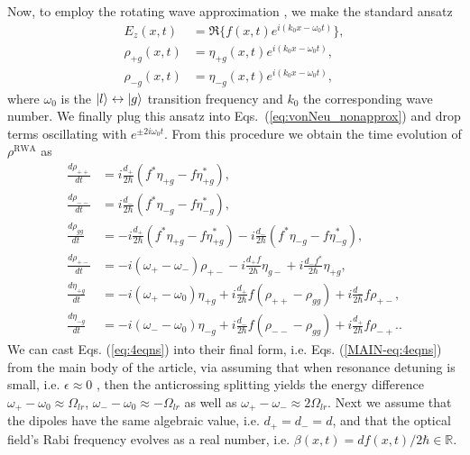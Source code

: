 \documentclass[preprint,secnumarabic,amssymb, nobibnotes, aip, prd]{revtex4-1}
\begin{document}
Now, to employ the rotating wave approximation \cite{weiner2011ultrafast}, we make the standard ansatz 
\begin{align}
E_z(x,t) &= \Re\{f(x,t)e^{i(k_0x-\omega_0t)}\}, \\
\rho_{+g}(x,t) &= \eta_{+g}(x,t)e^{i(k_0x-\omega_0t)}, \\
\rho_{-g}(x,t) &= \eta_{-g}(x,t)e^{i(k_0x-\omega_0t)},
\end{align}
where $\omega_0$ is the $\ket{l}\leftrightarrow\ket{g}$ transition frequency and $k_0$ the corresponding wave number.  We finally plug this ansatz into Eqs.~(\ref{eq:vonNeu_nonapprox}) and drop terms oscillating with $e^{\pm 2i\omega_0t}$. From this procedure we obtain the time evolution of $\rho^{\text{RWA}}$ as
\begin{subequations}
\label{eq:4eqns}
\begin{align}
\frac{d \rho_{++}}{dt} &= i\frac{d_{+}}{2\hbar}(f^*\eta_{+g}-f\eta_{+g}^*), \\
\frac{d \rho_{--}}{dt} &= i\frac{d_{-}}{2\hbar}(f^*\eta_{-g}-f\eta_{-g}^*), \\
\frac{d \rho_{gg}}{dt} &= - i\frac{d_{+}}{2\hbar}(f^*\eta_{+g}-f\eta_{+g}^*)-i\frac{d_{-}}{2\hbar}(f^*\eta_{-g}-f\eta_{-g}^*), \\
\frac{d \rho_{+-}}{dt} &= -i(\omega_+-\omega_-)\rho_{+-}-i\frac{d_{+}f}{2\hbar}\eta_{g-}+i\frac{d_{-}f^*}{2\hbar}\eta_{+g},\\
\frac{d \eta_{+g}}{dt} &= -i(\omega_+-\omega_{0})\eta_{+g}+i\frac{d_{+}}{2\hbar}f(\rho_{++}-\rho_{gg})+i\frac{d_{-}}{2\hbar}f\rho_{+-}, \label{eq:eta+g}\\
\frac{d \eta_{-g}}{dt} &= -i(\omega_--\omega_{0})\eta_{-g}+i\frac{d_{-}}{2\hbar}f(\rho_{--}-\rho_{gg})+i\frac{d_{+}}{2\hbar}f\rho_{-+}. \label{eq:eta-g}. 
\end{align}
\end{subequations}
We can cast Eqs. (\ref{eq:4eqns}) into their final form, i.e. Eqs. (\ref{MAIN-eq:4eqns}) from the main body of the article, via assuming that when resonance detuning is small, i.e. $\epsilon \approx  0$ , then the anticrossing splitting yields the energy difference $\omega_+-\omega_0 \approx \Omega_{lr}$, $\omega_--\omega_0\approx - \Omega_{lr}$ as well as $\omega_+-\omega_- \approx 2\Omega_{lr}$. Next we assume that the dipoles have the same algebraic value, i.e. $d_+ = d_- =d$, and that the optical field's Rabi frequency evolves as a real number, i.e. $\beta(x,t) = df(x,t)/2\hbar \in \mathbb{R}$. 
\end{document}
